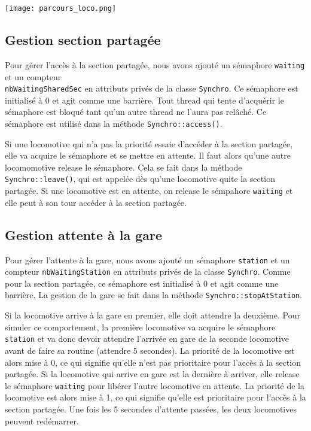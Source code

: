 \documentclass{article}
\begin{document}
\begin{center}
\texttt{[image: parcours\_loco.png]}
\end{center}

\subsection*{Gestion section partagée}
Pour gérer l'accès à la section partagée, nous avons ajouté un sémaphore \texttt{waiting} et un compteur 
\\ \texttt{nbWaitingSharedSec} en attributs privés de la classe \texttt{Synchro}.
Ce sémaphore est initialisé à 0 et agit comme une barrière. Tout thread qui tente d'acquérir le sémaphore est bloqué tant qu'un
autre thread ne l'aura pas relâché. Ce sémaphore est utilisé dans la méthode \texttt{Synchro::access()}. 

Si une locomotive qui n'a pas la priorité essaie d'accéder à la section partagée, elle va acquire le sémaphore et se mettre en attente. Il faut alors
qu'une autre locomomotive release le sémaphore. Cela se fait dans la méthode \texttt{Synchro::leave()}, qui est appelée dès qu'une
locomotive quite la section partagée. Si une locomotive est en attente, on release le sémpahore \texttt{waiting} et elle peut
à son tour accéder à la section partagée.

\subsection*{Gestion attente à la gare}
Pour gérer l'attente à la gare,  nous avons ajouté un sémaphore \texttt{station} et un compteur \texttt{nbWaitingStation} en attributs
privés de la classe \texttt{Synchro}. Comme pour la section partagée, ce sémaphore est initialisé à 0 et agit comme une barrière.
La gestion de la gare se fait dans la méthode \texttt{Synchro::stopAtStation}.

Si la locomotive arrive à la gare en premier, elle doit attendre la deuxième. Pour simuler ce comportement, la première locomotive
va acquire le sémaphore \texttt{station} et va donc devoir attendre l'arrivée en gare de la seconde locomotive avant de faire sa
routine (attendre 5 secondes). La priorité de la locomotive est alors mise à 0, ce qui signifie qu'elle n'est pas prioritaire pour 
l'accès à la section partagée. Si la locomotive qui arrive en gare est la dernière à arriver, elle release le sémaphore \texttt{waiting} 
pour libérer l'autre locomotive en attente. La priorité de la locomotive est 
alors mise à 1, ce qui signifie qu'elle est prioritaire pour l'accès à la section partagée. 
Une fois les 5 secondes d'attente passées, les deux locomotives peuvent redémarrer.
\end{document}
